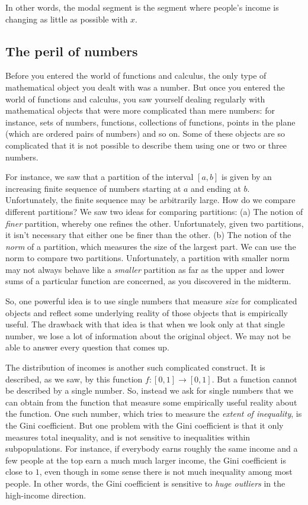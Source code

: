 \documentclass{amsart}
\begin{document}
In other words, the modal segment is the segment where people's income
is changing as little as possible with $x$.

\subsection{The peril of numbers}

Before you entered the world of functions and calculus, the only type
of mathematical object you dealt with was a number. But once you
entered the world of functions and calculus, you saw yourself dealing
regularly with mathematical objects that were more complicated than
mere numbers: for instance, sets of numbers, functions, collections of
functions, points in the plane (which are ordered pairs of numbers)
and so on. Some of these objects are so complicated that it is not
possible to describe them using one or two or three numbers.

For instance, we saw that a partition of the interval $[a,b]$ is given
by an increasing finite sequence of numbers starting at $a$ and ending
at $b$. Unfortunately, the finite sequence may be arbitrarily
large. How do we compare different partitions? We saw two ideas for
comparing partitions: (a) The notion of {\em finer} partition, whereby
one refines the other. Unfortunately, given two partitions, it isn't
necessary that either one be finer than the other. (b) The notion of
the {\em norm} of a partition, which measures the size of the largest
part. We can use the norm to compare two partitions. Unfortunately, a
partition with smaller norm may not always behave like a {\em smaller}
partition as far as the upper and lower sums of a particular function
are concerned, as you discovered in the midterm.

So, one powerful idea is to use single numbers that measure {\em size}
for complicated objects and reflect some underlying reality of those
objects that is empirically useful. The drawback with that idea is
that when we look only at that single number, we lose a lot of
information about the original object. We may not be able to answer
every question that comes up.

The distribution of incomes is another such complicated construct. It
is described, as we saw, by this function $f:[0,1] \to [0,1]$. But a
function cannot be described by a single number. So, instead we ask
for single numbers that we can obtain from the function that measure
some empirically useful reality about the function. One such number,
which tries to measure the {\em extent of inequality}, is the Gini
coefficient. But one problem with the Gini coefficient is that it only
measures total inequality, and is not sensitive to inequalities within
subpopulations. For instance, if everybody earns roughly the same
income and a few people at the top earn a much much larger income, the
Gini coefficient is close to $1$, even though in some sense there is
not much inequality among most people. In other words, the Gini
coefficient is sensitive to {\em huge outliers} in the high-income
direction.
\end{document}
